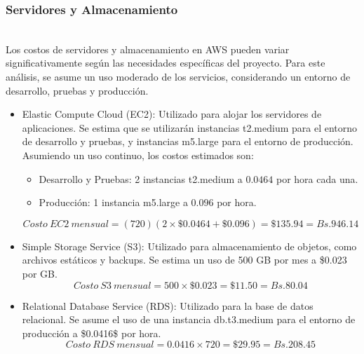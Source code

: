 

\subsubsection{Servidores y Almacenamiento}\hfill\\ 
\indent
Los costos de servidores y almacenamiento en AWS pueden variar significativamente según las necesidades específicas del proyecto. Para este análisis, se asume un uso moderado de los servicios, considerando un entorno de desarrollo, pruebas y producción. 

\begin{itemize}[noitemsep,topsep=0pt,parsep=0pt,partopsep=0pt]
    \item Elastic Compute Cloud (EC2): Utilizado para alojar los servidores de aplicaciones. Se estima que se utilizarán instancias t2.medium para el entorno de desarrollo y pruebas, y instancias m5.large para el entorno de producción. Asumiendo un uso continuo, los costos estimados son:
    \begin{itemize}[noitemsep,topsep=0pt,parsep=0pt,partopsep=0pt]
    \item Desarrollo y Pruebas: 2 instancias t2.medium a $0.0464$ por hora cada una.
    \item Producción: 1 instancia m5.large a $0.096$ por hora.
    \end{itemize}
    \begin{equation*}\label{eq_costo_ec2}
    Costo\ EC2\ mensual = (720) ( 2 \times \$0.0464 + \$0.096) = \$135.94 = Bs.946.14
    \end{equation*}
    \item Simple Storage Service (S3): Utilizado para almacenamiento de objetos, como archivos estáticos y backups. Se estima un uso de 500 GB por mes a \$0.023 por GB.
    \begin{equation*}\label{eq_costo_s3}
    Costo\ S3\ mensual = 500 \times \$0.023 = \$11.50 = Bs.80.04
    \end{equation*}
    \item Relational Database Service (RDS): Utilizado para la base de datos relacional. Se asume el uso de una instancia db.t3.medium para el entorno de producción a \$0.0416\$ por hora.
    \begin{equation*}\label{eq_costo_rds}
    Costo\ RDS\ mensual = 0.0416 \times 720 = \$29.95 = Bs.208.45
    \end{equation*}
\end{itemize}

